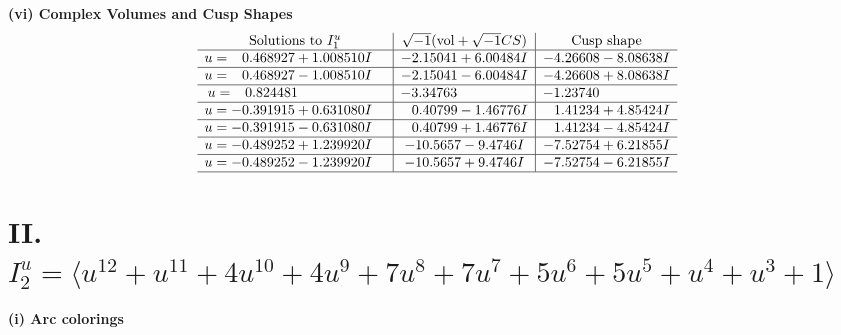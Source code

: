 \documentclass[1p]{elsarticle_modified}
\theoremstyle{definition}
\newcommand{\I}{\sqrt{-1}}
\begin{document}
\newpage\flushleft \textbf{(vi) Complex Volumes and Cusp Shapes}
$$\begin{array}{c|c|c}  
\text{Solutions to }I^u_{1}& \I (\text{vol} + \sqrt{-1}CS) & \text{Cusp shape}\\
 \hline 
\begin{aligned}
u &= \phantom{-}0.468927 + 1.008510 I\end{aligned}
 & -2.15041 + 6.00484 I & -4.26608 - 8.08638 I \\ \hline\begin{aligned}
u &= \phantom{-}0.468927 - 1.008510 I\end{aligned}
 & -2.15041 - 6.00484 I & -4.26608 + 8.08638 I \\ \hline\begin{aligned}
u &= \phantom{-}0.824481\phantom{ +0.000000I}\end{aligned}
 & -3.34763\phantom{ +0.000000I} & -1.23740\phantom{ +0.000000I} \\ \hline\begin{aligned}
u &= -0.391915 + 0.631080 I\end{aligned}
 & \phantom{-}0.40799 - 1.46776 I & \phantom{-}1.41234 + 4.85424 I \\ \hline\begin{aligned}
u &= -0.391915 - 0.631080 I\end{aligned}
 & \phantom{-}0.40799 + 1.46776 I & \phantom{-}1.41234 - 4.85424 I \\ \hline\begin{aligned}
u &= -0.489252 + 1.239920 I\end{aligned}
 & -10.5657 - 9.4746 I & -7.52754 + 6.21855 I \\ \hline\begin{aligned}
u &= -0.489252 - 1.239920 I\end{aligned}
 & -10.5657 + 9.4746 I & -7.52754 - 6.21855 I\\
 \hline 
 \end{array}$$\newpage\newpage\renewcommand{\arraystretch}{1}
\centering \section*{II. $I^u_{2}= \langle u^{12}+u^{11}+4 u^{10}+4 u^9+7 u^8+7 u^7+5 u^6+5 u^5+u^4+u^3+1 \rangle$}
\flushleft \textbf{(i) Arc colorings}\\
\end{document}
